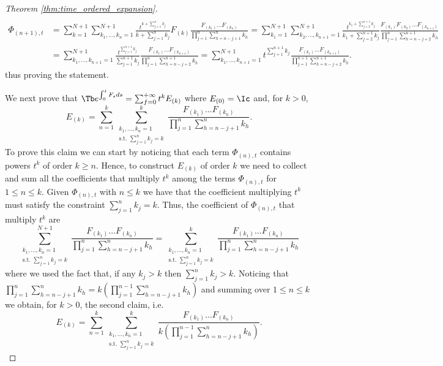 \begin{proof}[Theorem \ref{thm:time_ordered_expansion}]
\begin{align*}
    \end{align*}
    \begin{align*} \Phi_{(n+1),t}       
        &= \sum_{k=1}^{N+1} \sum_{k_1,\dots,k_n=1}^{N+1} \frac{t^{k+\sum_{j=1}^n k_j}}{k+\sum_{j=1}^n k_j} F_{(k)} \frac{F_{(k_1)}\dots F_{(k_n)}}{\prod_{j=1}^n \sum_{h=n-j+1}^n k_h} 
        = \sum_{k_1=1}^{N+1} \sum_{k_2,\dots,k_{n+1}=1}^{N+1} \frac{t^{k_1+\sum_{j=2}^{n+1} k_j}}{k_1+\sum_{j=2}^{n+1} k_j} \frac{F_{(k_1)}F_{(k_2)}\dots F_{(k_{n+1})}}{\prod_{j=1}^{n} \sum_{h=n-j+2}^{n+1} k_h}\\
        &= \sum_{k_1,\dots,k_{n+1}=1}^{N+1} \frac{t^{\sum_{j=1}^{n+1} k_j}}{\sum_{j=1}^{n+1} k_j} \frac{F_{(k_1)}\dots F_{(k_{n+1})}}{\prod_{j=1}^{n} \sum_{h=n-j+2}^{n+1} k_h}
        = \sum_{k_1,\dots,k_{n+1}=1}^{N+1} t^{\sum_{j=1}^{n+1} k_j} \frac{F_{(k_1)}\dots F_{(k_{n+1})}}{\prod_{j=1}^{n+1} \sum_{h=n-j+2}^{n+1} k_h}.
    \end{align*}
    thus proving the statement.

    We next prove that \(\Tb e^{\int_0^t F_s ds} = \sum_{f=0}^{+\infty} t^k E_{(k)}\) where $E_{(0)} = \Ic$ and, for $k>0$,
    \[ E_{(k)} = \sum_{n=1}^k \sum_{\substack{{k_1,\dots,k_{n} = 1}\\{\text{s.t. }\sum_{j=1}^{n}k_{j}=k}}}^{k} \frac{F_{(k_1)}\dots F_{(k_n)} }{\prod_{j=1}^n \sum_{h=n-j+1}^n k_h}. \]
    To prove this claim we can start by noticing that each term $\Phi_{(n),t}$ contains powers $t^k$ of order $k\geq n$. Hence, to construct $E_{(k)}$ of order $k$ we need to collect and sum all the coefficients that multiply $t^k$ among the terms $\Phi_{(n),t}$ for $1\leq n\leq k$. Given $\Phi_{(n),t}$ with $n\leq k$ we have that the coefficient multiplying $t^k$ must satisfy the constraint $\sum_{j=1}^n k_j = k$. 
    Thus, the coefficient of $\Phi_{(n),t}$ that multiply $t^k$ are
    \[\sum_{\substack{{k_1,\dots,k_{n} = 1}\\{\text{s.t. }\sum_{j=1}^{n}k_{j}=k}}}^{N+1} \frac{ F_{(k_1)}\dots F_{(k_n)}}{\prod_{j=1}^n \sum_{h=n-j+1}^n k_h} = \sum_{\substack{{k_1,\dots,k_{n} = 1}\\{\text{s.t. }\sum_{j=1}^{n}k_{j}=k}}}^{k} \frac{ F_{(k_1)}\dots F_{(k_n)}}{\prod_{j=1}^n \sum_{h=n-j+1}^n k_h}\]
    where we used the fact that, if any $k_j>k$ then $\sum_{j=1}^n k_j>k$.  
    Noticing that $\prod_{j=1}^n \sum_{h=n-j+1}^n k_h = k(\prod_{j=1}^{n-1} \sum_{h=n-j+1}^n k_h)$ and summing over $1\leq n\leq k$ we obtain, for $k>0$, the second claim, i.e.  
    \[E_{(k)} = \sum_{n=1}^{k} \sum_{\substack{{k_1,\dots,k_{n} = 1}\\{\text{s.t. }\sum_{j=1}^{n}k_{j}=k}}}^{k} \frac{ F_{(k_1)}\dots F_{(k_n)}}{k(\prod_{j=1}^{n-1} \sum_{h=n-j+1}^n k_h)}.\]


\end{proof}
